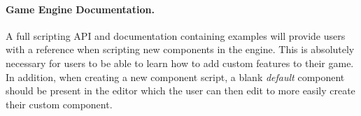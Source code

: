 \paragraph{Game Engine Documentation.}
A full scripting API and documentation containing examples will provide users with a reference when scripting new components in the engine. This is absolutely necessary for users to be able to learn how to add custom features to their game. In addition, when creating a new component script, a blank \emph{default} component should be present in the editor which the user can then edit to more easily create their custom component.
